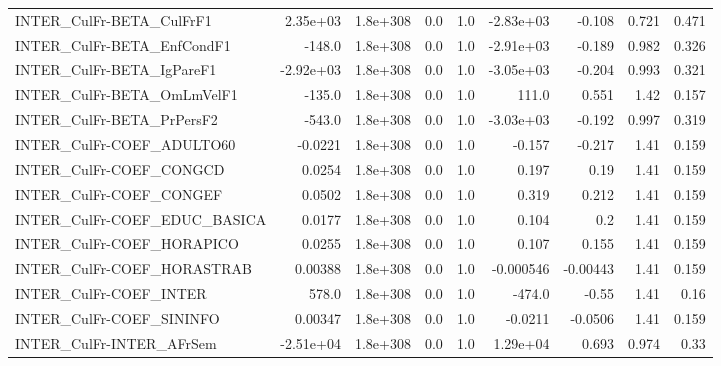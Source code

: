 \begin{tabular}{lrrrrrrrr}
INTER\_CulFr-BETA\_CulFrF1              &    2.35e+03 &     1.8e+308 &     0.0 &      1.0 &  -2.83e+03 &      -0.108 &        0.721 &         0.471 \\
INTER\_CulFr-BETA\_EnfCondF1            &      -148.0 &     1.8e+308 &     0.0 &      1.0 &  -2.91e+03 &      -0.189 &        0.982 &         0.326 \\
INTER\_CulFr-BETA\_IgPareF1             &   -2.92e+03 &     1.8e+308 &     0.0 &      1.0 &  -3.05e+03 &      -0.204 &        0.993 &         0.321 \\
INTER\_CulFr-BETA\_OmLmVelF1            &      -135.0 &     1.8e+308 &     0.0 &      1.0 &      111.0 &       0.551 &         1.42 &         0.157 \\
INTER\_CulFr-BETA\_PrPersF2             &      -543.0 &     1.8e+308 &     0.0 &      1.0 &  -3.03e+03 &      -0.192 &        0.997 &         0.319 \\
INTER\_CulFr-COEF\_ADULTO60             &     -0.0221 &     1.8e+308 &     0.0 &      1.0 &     -0.157 &      -0.217 &         1.41 &         0.159 \\
INTER\_CulFr-COEF\_CONGCD               &      0.0254 &     1.8e+308 &     0.0 &      1.0 &      0.197 &        0.19 &         1.41 &         0.159 \\
INTER\_CulFr-COEF\_CONGEF               &      0.0502 &     1.8e+308 &     0.0 &      1.0 &      0.319 &       0.212 &         1.41 &         0.159 \\
INTER\_CulFr-COEF\_EDUC\_BASICA          &      0.0177 &     1.8e+308 &     0.0 &      1.0 &      0.104 &         0.2 &         1.41 &         0.159 \\
INTER\_CulFr-COEF\_HORAPICO             &      0.0255 &     1.8e+308 &     0.0 &      1.0 &      0.107 &       0.155 &         1.41 &         0.159 \\
INTER\_CulFr-COEF\_HORASTRAB            &     0.00388 &     1.8e+308 &     0.0 &      1.0 &  -0.000546 &    -0.00443 &         1.41 &         0.159 \\
INTER\_CulFr-COEF\_INTER                &       578.0 &     1.8e+308 &     0.0 &      1.0 &     -474.0 &       -0.55 &         1.41 &          0.16 \\
INTER\_CulFr-COEF\_SININFO              &     0.00347 &     1.8e+308 &     0.0 &      1.0 &    -0.0211 &     -0.0506 &         1.41 &         0.159 \\
INTER\_CulFr-INTER\_AFrSem              &   -2.51e+04 &     1.8e+308 &     0.0 &      1.0 &   1.29e+04 &       0.693 &        0.974 &          0.33 \\

\end{tabular}
